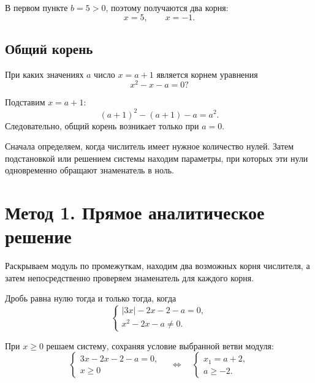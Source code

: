 В первом пункте \(b=5>0\), поэтому получаются два корня:
\[
  x=5,
  \qquad
  x=-1.
\]

\subsection{Общий корень}

\begin{trainingtask}
  При каких значениях \(a\) число \(x=a+1\) является корнем уравнения
  \[
    x^2-x-a=0?
  \]
\end{trainingtask}

Подставим \(x=a+1\):
\[
  (a+1)^2-(a+1)-a=a^2.
\]
Следовательно, общий корень возникает только при \(a=0\).

\begin{conclusionbox}
  Сначала определяем, когда числитель имеет нужное количество нулей. Затем
  подстановкой или решением системы находим параметры, при которых эти нули
  одновременно обращают знаменатель в ноль.
\end{conclusionbox}

\section{Метод 1. Прямое аналитическое решение}

\begin{methodintro}
  Раскрываем модуль по промежуткам, находим два возможных корня числителя,
  а затем непосредственно проверяем знаменатель для каждого корня.
\end{methodintro}

Дробь равна нулю тогда и только тогда, когда
\[
  \begin{cases}
    |3x|-2x-2-a=0,\\
    x^2-2x-a\ne 0.
  \end{cases}
\]


При \(x\ge 0\) решаем систему, сохраняя условие выбранной ветви модуля:
\[
  \begin{cases}
    3x-2x-2-a=0,\\
    x\ge 0
  \end{cases}
  \quad\Longleftrightarrow\quad
  \begin{cases}
    x_1=a+2,\\
    a\ge -2.
  \end{cases}
\]

